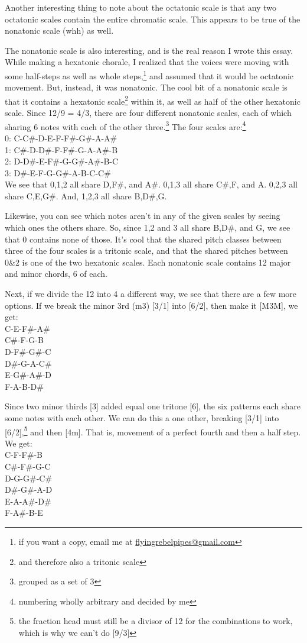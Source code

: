 \documentclass[12pt]{article}[titlepage]
\newcommand{\1}{\={a}}
\newcommand{\2}{\={e}}
\newcommand{\3}{\={\i}}
\newcommand{\4}{\=o}
\newcommand{\5}{\=u}
\newcommand{\6}{\={A}}
\renewcommand{\,}{\textsuperscript{,}}
\begin{document}
Another interesting thing to note about the octatonic scale is that any two octatonic scales contain the entire chromatic scale.
This appears to be true of the nonatonic scale (whh) as well.

The nonatonic scale is also interesting, and is the real reason I wrote this essay.
While making a hexatonic chorale, I realized that the voices were moving with some half-steps as well as whole steps,\footnote{if you want a copy, email me at \href{mailto:flyingrebelpipes@gmail.com}{flyingrebelpipes@gmail.com}} and assumed that it would be octatonic movement.
But, instead, it was nonatonic.
The cool bit of a nonatonic scale is that it contains a hexatonic scale\footnote{and therefore also a tritonic scale} within it, as well as half of the other hexatonic scale.
Since 12/9 = 4/3, there are four different nonatonic scales, each of which sharing 6 notes with each of the other three.\footnote{grouped as a set of 3}
The four scales are:\footnote{numbering wholly arbitrary and decided by me}\\
0: C-C\#-D-E-F-F\#-G\#-A-A\#\\
1: C\#-D-D\#-F-F\#-G-A-A\#-B\\
2: D-D\#-E-F\#-G-G\#-A\#-B-C\\
3: D\#-E-F-G-G\#-A-B-C-C\#\\

We see that 0,1,2 all share D,F\#, and A\#.
0,1,3 all share C\#,F, and A.
0,2,3 all share C,E,G\#.
And, 1,2,3 all share B,D\#,G.

Likewise, you can see which notes aren't in any of the given scales by seeing which ones the others share.
So, since 1,2 and 3 all share B,D\#, and G, we see that 0 contains none of those.
It's cool that the shared pitch classes between three of the four scales is a tritonic scale, and that the shared pitches between 0\&2 is one of the two hexatonic scales.
Each nonatonic scale contains 12 major and minor chords, 6 of each.

Next, if we divide the 12 into 4 a different way, we see that there are a few more options.
If we break the minor 3rd (m3) [3/1] into [6/2], then make it [M3M], we get:\\
C-E-F\#-A\#\\
C\#-F-G-B\\
D-F\#-G\#-C\\
D\#-G-A-C\#\\
E-G\#-A\#-D\\
F-A-B-D\#

Since two minor thirds [3] added equal one tritone [6], the six patterns each share some notes with each other.
We can do this a one other, breaking [3/1] into [6/2],\footnote{the fraction head must still be a divisor of 12 for the combinations to work, which is why we can't do [9/3]} and then [4m].
That is, movement of a perfect fourth and then a half step.
We get:\\
C-F-F\#-B\\
C\#-F\#-G-C\\
D-G-G\#-C\#\\
D\#-G\#-A-D\\
E-A-A\#-D\#\\
F-A\#-B-E
\end{document}
